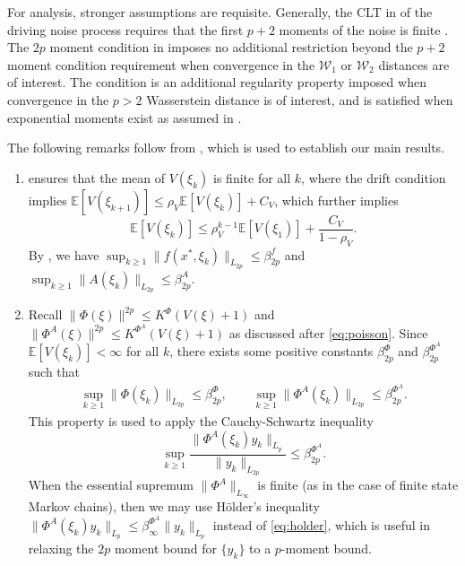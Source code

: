 \documentclass[11pt]{article}
\begin{document}
For \nonasymptotic analysis, stronger assumptions are requisite. 
Generally, the CLT in  of the driving noise process requires that the first $p + 2$ moments of the noise is finite \citep{rio_lb}. 
The $2p$ moment condition in  imposes no additional restriction beyond the $p + 2$ moment condition requirement when convergence in the $\mathcal{W}_1$ or $\mathcal{W}_2$ distances are of interest. 
The condition is an additional regularity property imposed when convergence in the $p > 2$ Wasserstein distance is of interest, and is satisfied when exponential moments exist as assumed in \citep{borkar25,chen_contractive_concentration}. 






The following remarks follow from , which is used to establish our main results.
\begin{enumerate}
    \item {} ensures that the mean of $V(\xi_k)$ is finite for all $k$, where the drift condition implies $\mathbb{E}[V(\xi_{k+1})] \leq \rho_V \mathbb{E}[V(\xi_k)] + C_V$, which further implies
    \begin{equation*}
        \mathbb{E}[V(\xi_k)] \leq \rho_V^{k-1} \mathbb{E}[V(\xi_1)] + \frac{C_V}{1-\rho_V} . 
    \end{equation*}    
    By , we have $\sup_{k \geq 1} \lVert f(x^*, \xi_k) \rVert_{L_{2p}} \leq \beta_{2p}^f$ and $\sup_{k \geq 1} \lVert A(\xi_k) \rVert_{L_{2p}} \leq \beta_{2p}^A$. 
    
    

        
    \item
    Recall $\lVert \Phi(\xi) \rVert^{2p} \leq K^\Phi (V(\xi) + 1)$ and $\lVert \Phi^A (\xi) \rVert^{2p} \leq K^{\Phi^A} (V(\xi) + 1)$ as discussed after \eqref{eq:poisson}. 
    Since $\mathbb{E}[V(\xi_k)] < \infty$ for all $k$, there exists some positive constants $\beta_{2p}^\Phi$ and $\beta_{2p}^{\Phi^A}$ such that
    \begin{align*}
        \sup_{k \geq 1} \lVert \Phi(\xi_k) \rVert_{L_{2p}} \leq \beta_{2p}^\Phi, 
        \qquad 
        \sup_{k \geq 1} \lVert \Phi^A (\xi_k) \rVert_{L_{2p}} \leq \beta_{2p}^{\Phi^A} . 
    \end{align*}
    This property is used to apply the Cauchy-Schwartz inequality
    \begin{equation}\label{eq:holder}
        \sup_{k \geq 1} \frac{\lVert \Phi^A(\xi_k) y_k \rVert_{L_p}}{\lVert y_k \rVert_{L_{2p}}} \leq \beta_{2p}^{\Phi^A}         .
    \end{equation}
    When the essential supremum $\lVert \Phi^A \rVert_{L_\infty}$ is finite (as in the case of finite state Markov chains), then we may use H\"{o}lder's inequality $\lVert \Phi^A (\xi_k) y_k \rVert_{L_p} \leq \beta_\infty^{\Phi^A} \lVert y_k \rVert_{L_p}$ instead of \eqref{eq:holder}, which is useful in relaxing the $2p$ moment bound for $\{y_k\}$ to a $p$-moment bound. 



\end{enumerate}
\end{document}
